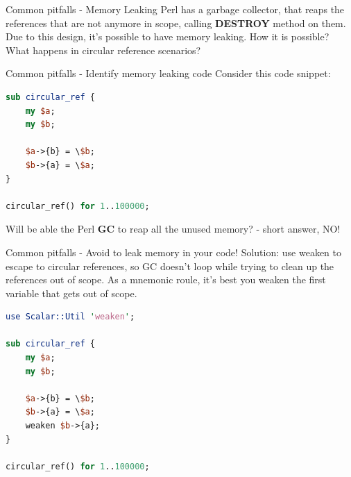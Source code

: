 \documentclass[10pt]{beamer}
\begin{document}
\begin{frame}[fragile]{Common pitfalls - Memory Leaking}
Perl has a garbage collector, that reaps the references that are not anymore in scope,  calling \textbf{DESTROY} method on them.
Due to this design, it's possible to have memory leaking.
How it is possible?
What happens in circular reference scenarios?

\end{frame}

\begin{frame}[fragile]{Common pitfalls - Identify memory leaking code}
Consider this code snippet:
\begin{lstlisting}[language=perl]
sub circular_ref {
	my $a;
	my $b;

	$a->{b} = \$b;
	$b->{a} = \$a;
}

circular_ref() for 1..100000;
\end{lstlisting}

Will be able the Perl \textbf{GC} to reap all the unused memory? - short answer, NO!
\pause
{}
\end{frame}

\begin{frame}[fragile]{Common pitfalls - Avoid to leak memory in your code!}
Solution: use weaken to escape to circular references, so GC doesn't loop while trying to clean up the references out of scope. As a mnemonic roule, it's best you weaken the first variable that gets out of scope.

\begin{lstlisting}[language=perl]
use Scalar::Util 'weaken';

sub circular_ref {
	my $a;
	my $b;

	$a->{b} = \$b;
	$b->{a} = \$a;
	weaken $b->{a};
}

circular_ref() for 1..100000;
\end{lstlisting}

\end{frame}

\end{document}
